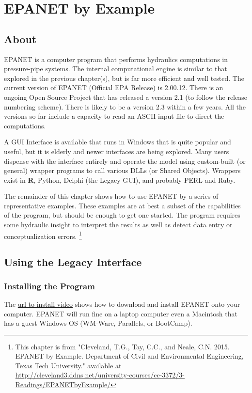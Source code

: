 \section{EPANET by Example}
\subsection{About}
EPANET is a computer program that performs hydraulics computations in pressure-pipe systems.  
The internal computational engine is similar to that explored in the previous chapter(s), but is far more efficient and well tested.
The current version of EPANET (Official EPA Release) is  2.00.12.  
There is an ongoing Open Source Project that has released a version 2.1 (to follow the release numbering scheme).
There is likely to be a version 2.3 within a few years.  
All the versions so far include a capacity to read an ASCII input file to direct the computations.

A GUI Interface is available that runs in Windows that is quite popular and useful, but it is elderly and newer interfaces are being explored.
Many users dispense with the interface entirely and operate the model using custom-built (or general) wrapper programs to call various DLLs (or Shared Objects).  Wrappers exist in \textbf{R}, Python, Delphi (the Legacy GUI), and probably PERL and Ruby.  

The remainder of this chapter shows how to use EPANET by a series of representative examples.  These examples are at best a subset of the capabilities of the program, but should be enough to get one started.   The program requires some hydraulic insight to interpret the results as well as detect data entry or conceptualization errors.
\footnote{This chapter is from "Cleveland, T.G., Tay, C.C., and Neale, C.N. 2015. EPANET by Example. Department of Civil and Environmental Engineering, Texas Tech University."  available at \\
\url{http://cleveland3.ddns.net/university-courses/ce-3372/3-Readings/EPANETbyExample/}
}
\subsection{Using the Legacy Interface}
\subsubsection{Installing the Program}
The \url{url to install video} shows how to download and install EPANET onto your computer.  
EPANET will run fine on a laptop computer even a Macintosh that has a guest Windows OS (WM-Ware, Parallels, or BootCamp).   

